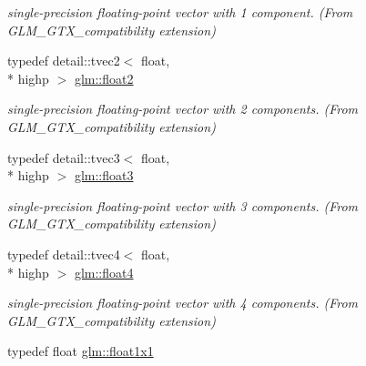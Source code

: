 \begin{DoxyCompactItemize}
\begin{DoxyCompactList}\small\item\em single-\/precision floating-\/point vector with 1 component. (From G\-L\-M\-\_\-\-G\-T\-X\-\_\-compatibility extension) \end{DoxyCompactList}\item 
\hypertarget{group__gtx__compatibility_ga6ab0b791bbb15ef51a0e930a8710e6b1}{typedef detail\-::tvec2$<$ float, \\*
highp $>$ \hyperlink{group__gtx__compatibility_ga6ab0b791bbb15ef51a0e930a8710e6b1}{glm\-::float2}}\label{group__gtx__compatibility_ga6ab0b791bbb15ef51a0e930a8710e6b1}

\begin{DoxyCompactList}\small\item\em single-\/precision floating-\/point vector with 2 components. (From G\-L\-M\-\_\-\-G\-T\-X\-\_\-compatibility extension) \end{DoxyCompactList}\item 
\hypertarget{group__gtx__compatibility_ga7e0d8fa3501c0a7eaaca31adb6e02de2}{typedef detail\-::tvec3$<$ float, \\*
highp $>$ \hyperlink{group__gtx__compatibility_ga7e0d8fa3501c0a7eaaca31adb6e02de2}{glm\-::float3}}\label{group__gtx__compatibility_ga7e0d8fa3501c0a7eaaca31adb6e02de2}

\begin{DoxyCompactList}\small\item\em single-\/precision floating-\/point vector with 3 components. (From G\-L\-M\-\_\-\-G\-T\-X\-\_\-compatibility extension) \end{DoxyCompactList}\item 
\hypertarget{group__gtx__compatibility_gac0676d140051809309ca683c325bf439}{typedef detail\-::tvec4$<$ float, \\*
highp $>$ \hyperlink{group__gtx__compatibility_gac0676d140051809309ca683c325bf439}{glm\-::float4}}\label{group__gtx__compatibility_gac0676d140051809309ca683c325bf439}

\begin{DoxyCompactList}\small\item\em single-\/precision floating-\/point vector with 4 components. (From G\-L\-M\-\_\-\-G\-T\-X\-\_\-compatibility extension) \end{DoxyCompactList}\item 
\hypertarget{group__gtx__compatibility_gaac1faa940ac1fbb32d4a315005b578af}{typedef float \hyperlink{group__gtx__compatibility_gaac1faa940ac1fbb32d4a315005b578af}{glm\-::float1x1}}\label{group__gtx__compatibility_gaac1faa940ac1fbb32d4a315005b578af}


\end{DoxyCompactItemize}
